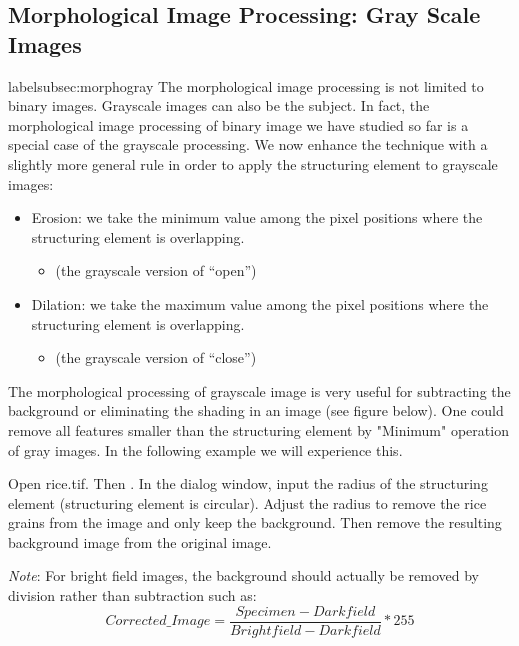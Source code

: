\subsection{Morphological Image Processing: Gray Scale Images}
label{subsec:morphogray}
The morphological image processing is not limited to binary images. Grayscale images can also be the subject. In fact, the morphological image processing of binary image we have studied so far is a special case of the grayscale processing. We now enhance the technique with a slightly more general rule in order to apply the structuring element to grayscale images: 
\begin{itemize}
\item Erosion: we take the minimum value among the pixel positions where the structuring element is overlapping.   
\begin{itemize}
\item {} (the grayscale version of ``open'')
\end{itemize}
\item Dilation: we take the maximum value among the pixel positions where the structuring element is overlapping. 
\begin{itemize}
\item {} (the grayscale version of ``close'')
\end{itemize}
\end{itemize}

The morphological processing of grayscale image is very useful for
subtracting the background or eliminating the shading in an
image (see figure below). One could remove all features smaller than
the structuring element by "Minimum"
operation of gray images. In the following example we will experience
this.

\begin{indentexercise}{1}
\label{exer:removerice}
Open rice.tif. Then . In the dialog
window, input the radius of the structuring element (structuring
element is circular). Adjust the radius to remove the rice grains from the image and only keep the background. Then remove the
resulting background image from the original image. 

\textit{Note}: For bright field images, the background should actually be removed by division rather than subtraction such as: 
\[
Corrected\_Image = \frac{Specimen - Darkfield}{Brightfield - Darkfield} * 255
\]
\end{indentexercise}



